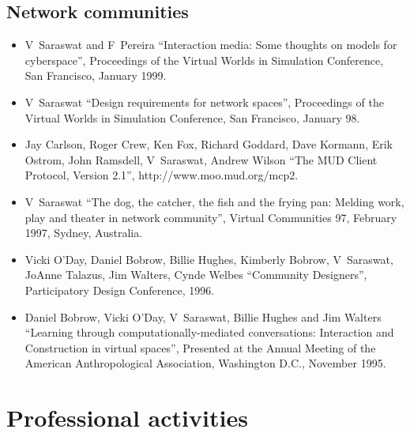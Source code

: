\documentclass{article}
\begin{document}
\subsection*{Network communities}
\begin{itemize}
\item V~Saraswat and F~Pereira ``Interaction media: Some
  thoughts on models for cyberspace'', Proceedings of the Virtual
  Worlds in Simulation Conference, San Francisco, January 1999.

\item  V~Saraswat ``Design requirements for network spaces'',
  Proceedings of the Virtual Worlds in Simulation Conference, San
  Francisco, January 98.

\item Jay Carlson, Roger Crew, Ken Fox, Richard Goddard, Dave Kormann,
  Erik Ostrom, John Ramsdell, V~Saraswat, Andrew Wilson ``The MUD
  Client Protocol, Version 2.1'', http://www.moo.mud.org/mcp2.

\item  V~Saraswat ``The dog, the catcher, the fish and the
  frying pan: Melding work, play and theater in network
  community'', Virtual Communities 97, February 1997, Sydney,
  Australia. 
  
\item  Vicki O'Day, Daniel Bobrow, Billie Hughes, Kimberly Bobrow,
  V~Saraswat, JoAnne Talazus, Jim Walters, Cynde Welbes
  ``Community Designers'', Participatory Design Conference, 1996.

\item  Daniel Bobrow, Vicki O'Day, V~Saraswat, Billie Hughes and
  Jim Walters ``Learning through computationally-mediated
  conversations: Interaction and Construction in virtual
  spaces'', Presented at the Annual Meeting of the American
  Anthropological Association, Washington D.C., November 1995.
\end{itemize}

    

\section*{Professional activities}


\end{document}
